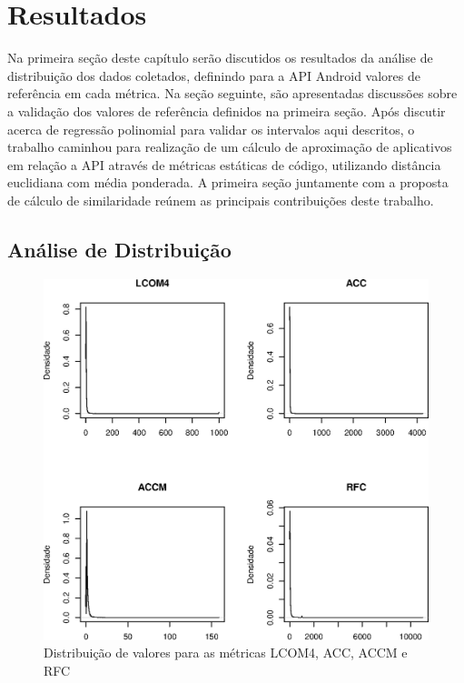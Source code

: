 \chapter{Resultados}
\label{cap:resultados}

Na primeira seção deste capítulo serão discutidos os resultados da análise de distribuição dos dados coletados, definindo para a API Android valores de referência em cada métrica. Na seção seguinte, são apresentadas discussões sobre a validação dos valores de referência definidos na primeira seção. Após discutir acerca de regressão polinomial para validar os intervalos aqui descritos, o trabalho caminhou para realização de um cálculo de aproximação de aplicativos em relação a API através de métricas estáticas de código, utilizando distância euclidiana com média ponderada. A primeira seção juntamente com a proposta de cálculo de similaridade reúnem as principais contribuições deste trabalho.

\section{Análise de Distribuição}

\begin{figure}[!htb]
\centering
\includegraphics [keepaspectratio=true,scale=0.70]{figuras/android510dist.eps}
\caption{Distribuição de valores para as métricas LCOM4, ACC, ACCM e RFC}
\label{fig:android510dist}
\end{figure}

